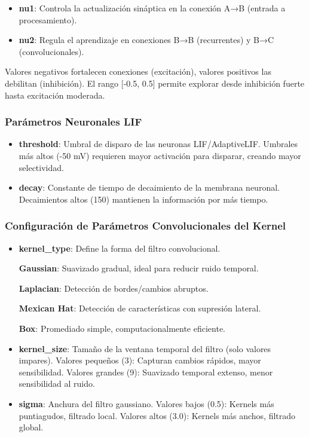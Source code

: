 \begin{itemize}
    \item \textbf{nu1}: Controla la actualización sináptica en la conexión A→B (entrada a procesamiento).
    \item \textbf{nu2}: Regula el aprendizaje en conexiones B→B (recurrentes) y B→C (convolucionales).
\end{itemize}

 Valores negativos fortalecen conexiones (excitación), valores positivos las debilitan (inhibición). El rango [-0.5, 0.5] permite explorar desde inhibición fuerte hasta excitación moderada.

\subsubsection*{Parámetros Neuronales LIF}

\begin{itemize}
    \item \textbf{threshold}:  Umbral de disparo de las neuronas LIF/AdaptiveLIF. Umbrales más altos (-50 mV) requieren mayor activación para disparar, creando mayor selectividad.
    \item \textbf{decay}: Constante de tiempo de decaimiento de la membrana neuronal. Decaimientos altos (150) mantienen la información por más tiempo.
\end{itemize}


\subsubsection{Configuración de Parámetros Convolucionales del Kernel}


\begin{itemize}
    \item \textbf{kernel\_type}: Define la forma del filtro convolucional.
    
    \textbf{Gaussian}: Suavizado gradual, ideal para reducir ruido temporal.
   
    \textbf{Laplacian}: Detección de bordes/cambios abruptos.

    \textbf{Mexican Hat}: Detección de características con supresión lateral.

    \textbf{Box}: Promediado simple, computacionalmente eficiente.
    
    \item \textbf{kernel\_size}: Tamaño de la ventana temporal del filtro (solo valores impares). 
    Valores pequeños (3): Capturan cambios rápidos, mayor sensibilidad.
Valores grandes (9): Suavizado temporal extenso, menor sensibilidad al ruido.
    \item \textbf{sigma}: Anchura del filtro gaussiano.
    Valores bajos (0.5): Kernels más puntiagudos, filtrado local.
Valores altos (3.0): Kernels más anchos, filtrado global.
\end{itemize}

